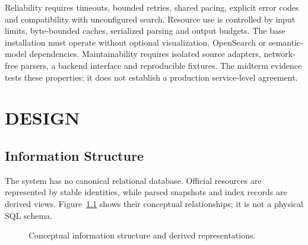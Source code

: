 \documentclass[a4paper,12pt]{report}
\begin{document}
Reliability requires timeouts, bounded retries, shared pacing, explicit error codes and compatibility with unconfigured search. Resource use is controlled by input limits, byte-bounded caches, serialized parsing and output budgets. The base installation must operate without optional visualization, OpenSearch or semantic-model dependencies. Maintainability requires isolated source adapters, network-free parsers, a backend interface and reproducible fixtures. The midterm evidence tests these properties; it does not establish a production service-level agreement.

\chapter{DESIGN}
\section{Information Structure}
The system has no canonical relational database. Official resources are represented by stable identities, while parsed snapshots and index records are derived views. Figure~\ref{fig:entities} shows their conceptual relationships; it is not a physical SQL schema.

\begin{figure}[H]
\centering
\begingroup\renewcommand{\baselinestretch}{1}\selectfont
{}
\endgroup
\caption{Conceptual information structure and derived representations.}
\label{fig:entities}
\end{figure}
\end{document}
